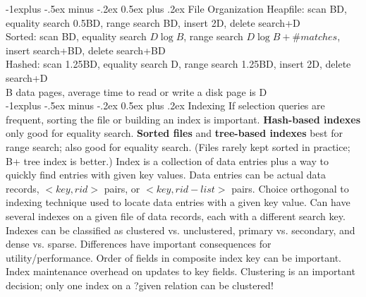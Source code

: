 \documentclass[12pt,landscape]{article}
\makeatletter
\renewcommand{\subsection}{\@startsection{subsection}{2}{0mm}%
                                {-1explus -.5ex minus -.2ex}%
                                {0.5ex plus .2ex}%
                                {\normalfont\normalsize\bfseries}}
\makeatother
\begin{document}
\raggedright
\footnotesize
\begin{multicols}{3}


\setlength{\premulticols}{1pt}
\setlength{\postmulticols}{1pt}
\setlength{\multicolsep}{1pt}
\setlength{\columnsep}{2pt}

\subsection{File Organization}
Heapfile: scan BD, equality search 0.5BD, range search BD, insert 2D, delete search+D\\
Sorted: scan BD, equality search $D\log{B}$, range search $D\log{B} + \#matches$, insert search+BD, delete search+BD\\
Hashed: scan 1.25BD, equality search D, range search 1.25BD, insert 2D, delete search+D\\
B data pages, average time to read or write a disk page is D \\

\subsection{Indexing}
If selection queries are frequent, sorting the file or building an index is important. {\bf Hash-based indexes} only good for equality search. {\bf Sorted files} and {\bf tree-based indexes} best for range search; also good for equality search. (Files rarely kept sorted in practice; B+ tree index is better.) Index is a collection of data entries plus a way to quickly find entries with given key values. Data entries can be actual data records, $<key, rid>$ pairs, or $<key, rid-list>$ pairs. Choice orthogonal to indexing technique used to locate data entries with a given key value. Can have several indexes on a given file of data records, each with a different search key. Indexes can be classified as clustered vs. unclustered, primary vs. secondary, and dense vs. sparse. Differences have important
consequences for utility/performance. Order of fields in composite index key can be important. Index maintenance overhead on updates to key fields. Clustering is an important decision; only one index on a ?given relation can be clustered! 


\end{multicols}
\end{document}
